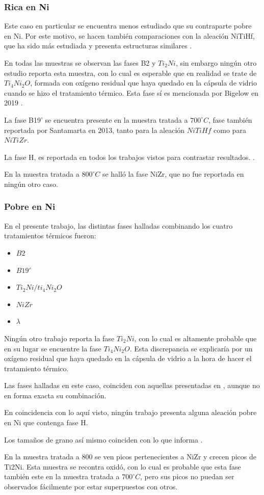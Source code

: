 \documentclass[12pt]{article}
\theoremstyle{definition}
\theoremstyle{remark}
\begin{document}
{\subsubsection{Rica en Ni}

Este caso en particular se encuentra menos estudiado que su contraparte pobre en Ni. Por este motivo, se hacen también comparaciones con la aleación NiTiHf, que ha sido más estudiada y presenta estructuras similares \cite{Santamarta2013}.

En todas las muestras se observan las fases B2 y $Ti_2Ni$, sin embargo ningún otro estudio reporta esta muestra, con lo cual es esperable que en realidad se trate de $Ti_4Ni_2O$, formada con oxígeno residual que haya quedado en la cápsula de vidrio cuando se hizo el tratamiento térmico. Esta fase sí es mencionada por Bigelow en 2019 \cite{Bigelow2019}. 

La fase B19' se encuentra presente en la muestra tratada a $700 ^\circ C$, fase también reportada por Santamarta en 2013, tanto para la aleación $NiTiHf$ como para $NiTiZr$.

La fase H, es reportada en todos los trabajos vistos para contrastar resultados. \cite{Santamarta2013} \cite{Bigelow2019} \cite{Evirgen2018} \cite{Yang2013}.

En la muestra tratada a $800 ^\circ C$ se halló la fase NiZr, que no fue reportada en ningún otro caso.

\subsubsection{Pobre en Ni}
\label{DPobreNi}

En el presente trabajo, las distintas fases halladas combinando los cuatro tratamientos térmicos fueron:
\begin{itemize}
\item $B2$
\item $B19'$
\item $Ti_2Ni/ti_4Ni_2O$
\item $NiZr$
\item $\lambda$
\end{itemize}

Ningún otro trabajo reporta la fase $Ti_2Ni$, con lo cual es altamente probable que en su lugar se encuentre la fase $Ti_4Ni_2O$. Esta discrepancia se explicaría por un oxígeno residual que haya quedado en la cápsula de vidrio a la hora de hacer el tratamiento térmico.

Las fases halladas en este caso, coinciden con aquellas presentadas en \cite{XiaoyangYi2018}, aunque no en forma exacta su combinación.

En coincidencia con lo aquí visto, ningún trabajo presenta alguna aleación pobre en Ni que contenga fase H.

Los tamaños de grano así mismo coinciden con lo que informa \cite{Sawaguchi2004}.

En la muestra tratada a 800 se ven picos pertenecientes a NiZr y crecen picos de Ti2Ni. Esta muestra se recontra oxidó, con lo cual es probable que esta fase también este en la muestra tratada a $700 ^\circ C$, pero sus picos no puedan ser observados fácilmente por estar superpuestos con otros.}
\end{document}
